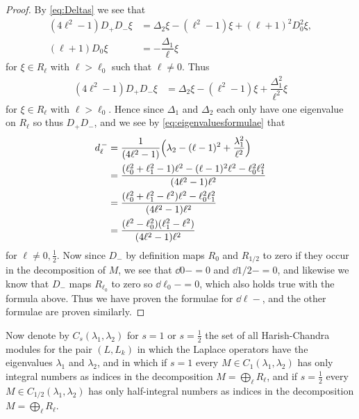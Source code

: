 \begin{proof}
  By \cref{eq:Deltas} we see that
  \begin{align*}
    (4\ell^2-1)D_+D_-\xi &= \Delta_2\xi -(\ell^2-1)\xi + (\ell+1)^2D_0^2\xi, \\
    (\ell+1)D_0 \xi &= -\dfrac{\Delta_1}{\ell}\xi
  \end{align*}
  for $\xi\in R_\ell$ with $\ell>\ell_0$ such that $\ell\neq 0$. Thus
  \begin{align*}
    (4\ell^2-1)D_+D_-\xi &= \Delta_2\xi -(\ell^2-1)\xi + \dfrac{\Delta_1^2}{\ell^2}\xi
  \end{align*}
  for $\xi\in R_\ell$ with $\ell>\ell_0$. Hence since $\Delta_1$ and $\Delta_2$ each only have one eigenvalue on $R_\ell$ so thus $D_+D_-$, and we see by \cref{eq:eigenvaluesformulae} that
  \begin{align*}
    d_{\ell}^{\,-} &= \dfrac{1}{(4\ell^2-1)}\Bigl( \lambda_2 - (\ell-1)^2 + \dfrac{\lambda_1^2}{\ell^2}  \Bigr) \\
                 &= \dfrac{(\ell_0^2+\ell_1^2-1)\ell^2 - (\ell-1)^2\ell^2 - \ell_0^2\ell_1^2}{(4\ell^2-1)\ell^2} \\
                 &= \dfrac{(\ell_0^2+\ell_1^2-\ell^2)\ell^2 - \ell_0^2\ell_1^2}{(4\ell^2-1)\ell^2} \\
                 &= \dfrac{(\ell^2-\ell_0^2)(\ell_1^2-\ell^2)}{(4\ell^2-1)\ell^2} \\
  \end{align*}
  for $\ell\neq 0,\tfrac{1}{2}$. Now since $D_-$ by definition maps $R_0$ and $R_{1/2}$ to zero if they occur in the decomposition of $M$, we see that $\dd{0}{-}=0$ and $\dd{1/2}{-}=0$, and likewise we know that $D_-$ maps $R_{\ell_0}$ to zero so $\dd{\ell_0}{-}=0$, which also holds true with the formula above. Thus we have proven the formulae for $\dd{\ell}{-}$, and the other formulae are proven similarly. 
\end{proof}

Now denote by $C_s(\lambda_1,\lambda_2)$ for $s=1$ or $s=\tfrac{1}{2}$ the set of all Harish-Chandra modules for the pair $(L,L_k)$ in which the Laplace operators have the eigenvalues $\lambda_1$ and $\lambda_2$, and in which if $s=1$ every $M\in C_1(\lambda_1,\lambda_2)$ has only integral numbers as indices in the decomposition $M=\bigoplus_\ell R_\ell$, and if $s=\tfrac{1}{2}$ every $M\in C_{1/2}(\lambda_1,\lambda_2)$ has only half-integral numbers as indices in the decomposition $M=\bigoplus_\ell R_\ell$. 


